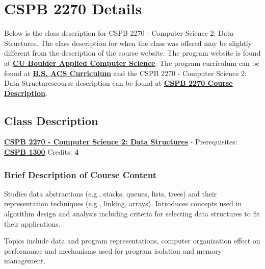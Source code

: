\newcommand{\CSPBDataStruct}{CSPB 2270 - Computer Science 2: Data Structures}

\chapter{CSPB 2270 Details}
Below is the class description for \CSPBDataStruct. The class description for when the class was offered may be slightly different from the description of the course website. The program website is found at \href{https://www.colorado.edu/program/cspb/}{\textbf{CU Boulder Applied Computer Science}}. The program curriculum can be found at \href{https://www.colorado.edu/program/cspb/academics/curriculum-course-list}{\textbf{B.S. ACS Curriculum}} and the \CSPBDataStruct course description can be found at \href{https://www.colorado.edu/program/cspb/cspb-2270-computer-science-2-data-structures}{\textbf{CSPB 2270 Course Description}}.

\section{Class Description}
\horizontalline
\noindent \href{https://www.colorado.edu/program/cspb/cspb-2270-computer-science-2-data-structures}{\textbf{\CSPBDataStruct}} - Prerequisites: \href{https://www.colorado.edu/program/cspb/cspb-1300-computer-science-1-starting-computing}{\textbf{CSPB 1300}} Credits: \textbf{4}
\subsection{Brief Description of Course Content}
Studies data abstractions (e.g., stacks, queues, lists, trees) and their representation techniques (e.g., linking, arrays). Introduces concepts used in algorithm design and analysis including criteria for selecting data structures to fit their applications.

\noindent Topics include data and program representations, computer organization effect on performance and mechanisms used for program isolation and memory management.

